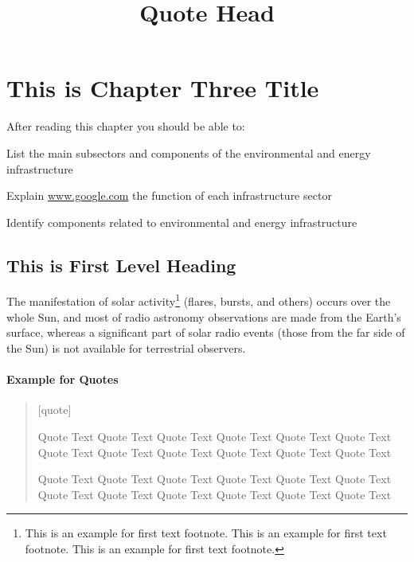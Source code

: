 
\chapter{This is Chapter Three Title}

After reading this chapter you should be able to:

\begin{objectives}
\item List the main subsectors and components of the environmental and energy infrastructure

\item Explain \url{www.google.com} the function of each infrastructure sector

\item Identify components related to environmental and energy infrastructure
\end{objectives}

\section{This is First Level Heading}

\lipsum[1]

The manifestation of solar activity\footnote{This is an example for first text footnote. This is an example for first text footnote. This is an example for first text footnote.} (flares, bursts, and others) occurs over the whole Sun, and most of radio astronomy observations are made from the Earth's surface, whereas a significant part of solar radio events (those from the far side of the Sun) is not available for terrestrial observers.

\subsubsection*{Example for Quotes}

\begin{quote}[quote]

\title{Quote Head}

Quote Text  Quote Text  Quote Text  Quote Text Quote Text Quote Text 
Quote Text  Quote Text  Quote Text  Quote Text Quote Text Quote Text 


Quote Text  Quote Text  Quote Text  Quote Text Quote Text Quote Text 
Quote Text  Quote Text  Quote Text  Quote Text Quote Text Quote Text 


\end{quote}

